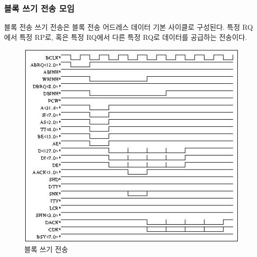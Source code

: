 \subsubsection{블록 쓰기 전송 모임}
블록 전송 쓰기 전송은 블록 전송 어드레스 데이터 기본 사이클로 구성된다.
특정 RQ에서 특정 RP로, 혹은 특정 RQ에서 다른 특정 RQ로 데이터를 공급하는 전송이다.
\begin{figure}[hp]
   \centerline{\includegraphics{ch3/FIG/block-write.jpg}}
   \caption{블록 쓰기 전송}\label{figure:block-write}
\end{figure}
%
